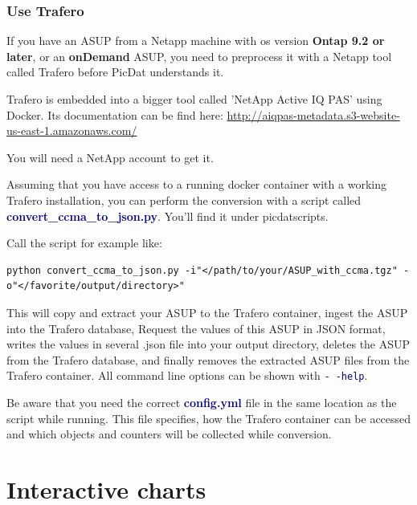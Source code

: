 \documentclass[8pt]{beamer}
\begin{document}
\begin{frame}[fragile, label=trafero]
\frametitle{Use Trafero}
If you have an ASUP from a Netapp machine with os version \textbf{Ontap 9.2 or later}, or an \textbf{onDemand} ASUP, you need to preprocess it with a Netapp tool called Trafero before PicDat understands it.

Trafero is embedded into a bigger tool called 'NetApp Active IQ PAS' using Docker. Its documentation can be find here: \url{http://aiqpas-metadata.s3-website-us-east-1.amazonaws.com/}

You will need a NetApp account to get it.
\bigskip

Assuming that you have access to a running docker container with a working Trafero installation, you can perform the conversion with a script called \textcolor{darkblue}{\textbf{convert\_ccma\_to\_json.py}}. You'll find it under picdatscripts.
\bigskip

Call the script for example like:

\begin{lstlisting}
python convert_ccma_to_json.py -i"</path/to/your/ASUP_with_ccma.tgz" -o"</favorite/output/directory>"
\end{lstlisting}

This will copy and extract your ASUP to the Trafero container, ingest the ASUP into the Trafero database, Request the values of this ASUP in JSON format, writes the values in several .json file into your output directory, deletes the ASUP from the Trafero database, and finally removes the extracted ASUP files from the Trafero container. All command line options can be shown with \textcolor{darkblue}{\texttt{-\,-help}}.
\bigskip

Be aware that you need the correct \textcolor{darkblue}{\textbf{config.yml}} file in the same location as the script while running. This file specifies, how the Trafero container can be accessed and which objects and counters will be collected while conversion. 
\end{frame}

\section{Interactive charts}
\end{document}
